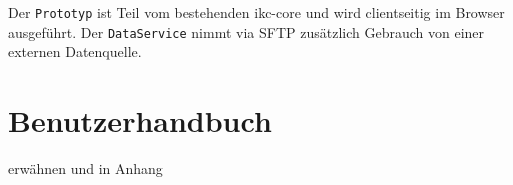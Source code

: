 Der \texttt{Prototyp} ist Teil vom bestehenden \gls{ikc-core} und wird clientseitig im Browser ausgeführt. Der \texttt{DataService} nimmt via \gls{SFTP} zusätzlich Gebrauch von einer externen Datenquelle.


\section{Benutzerhandbuch}



erwähnen und in Anhang
